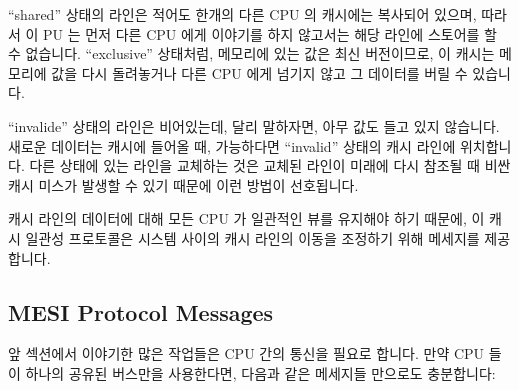 ``shared'' 상태의 라인은 적어도 한개의 다른 CPU 의 캐시에는 복사되어 있으며,
따라서 이 PU 는 먼저 다른 CPU 에게 이야기를 하지 않고서는 해당 라인에 스토어를
할 수 없습니다.
``exclusive'' 상태처럼, 메모리에 있는 값은 최신 버전이므로, 이 캐시는 메모리에
값을 다시 돌려놓거나 다른 CPU 에게 넘기지 않고 그 데이터를 버릴 수 있습니다.

``invalide'' 상태의 라인은 비어있는데, 달리 말하자면, 아무 값도 들고 있지
않습니다.
새로운 데이터는 캐시에 들어올 때, 가능하다면 ``invalid'' 상태의 캐시 라인에
위치합니다.
다른 상태에 있는 라인을 교체하는 것은 교체된 라인이 미래에 다시 참조될 때 비싼
캐시 미스가 발생할 수 있기 때문에 이런 방법이 선호됩니다.

캐시 라인의 데이터에 대해 모든 CPU 가 일관적인 뷰를 유지해야 하기 때문에, 이
캐시 일관성 프로토콜은 시스템 사이의 캐시 라인의 이동을 조정하기 위해 메세지를
제공합니다.

\subsection{MESI Protocol Messages}
\label{sec:app:whymb:MESI Protocol Messages}

앞 섹션에서 이야기한 많은 작업들은 CPU 간의 통신을 필요로 합니다.
만약 CPU 들이 하나의 공유된 버스만을 사용한다면, 다음과 같은 메세지들 만으로도
충분합니다:
\iffalse

